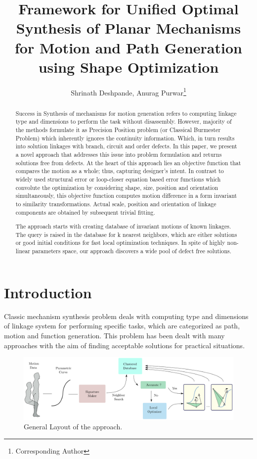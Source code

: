 \documentclass[twocolumn,10pt]{asme2e}
\title{Framework for Unified Optimal Synthesis of Planar Mechanisms for Motion and Path Generation using Shape Optimization}
\author{Shrinath Deshpande, Anurag Purwar\footnote{Corresponding Author}\\
    \affiliation{
    Computer-Aided Design and Innovation Lab \\
    Department of Mechanical Engineering\\
    Stony Brook University\\
    Stony Brook, New York, 11794-2300
    }
   }
\begin{document}
\maketitle

\begin{abstract}

Success in Synthesis of mechanisms for motion generation refers to computing linkage type and dimensions to perform the task without disassembly.
However, majority of the methods formulate it as Precision Position problem (or Classical Burmester Problem) which inherently ignores the continuity information.
Which, in turn results into solution linkages with branch, circuit and order defects.
In this paper, we present a novel approach that addresses this issue into problem formulation and returns solutions free from defects.
At the heart of this approach lies an objective function that compares the motion as a whole; thus, capturing designer's intent.
In contrast to widely used structural error or loop-closer equation based error functions which convolute the optimization by considering shape, size, position and orientation simultaneously, this objective function computes motion difference in a form invariant to similarity transformations.
Actual scale, position and orientation of linkage components are obtained by subsequent trivial fitting.

The approach starts with creating database of invariant motions of known linkages.
  The query is raised in the database for k nearest neighbors, which are either solutions or good initial conditions for fast local optimization techniques.
In spite of highly non-linear parameters space, our approach discovers a wide pool of defect free solutions.
\end{abstract}

\section{Introduction}
Classic mechanism synthesis problem deals with computing type and dimensions of linkage system for performing specific tasks, which are categorized as path, motion and function generation.
This problem has been dealt with many approaches with the aim of finding acceptable solutions for practical situations.

\begin{figure}
\centering
\includegraphics[width=\textwidth]{figure/overall_approach.eps}
  \caption{General Layout of the approach.}
\label{overallMethod}
\end{figure}
\end{document}
